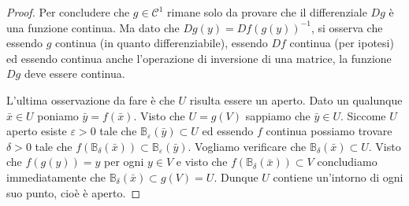 \documentclass[italian]{article}
\theoremstyle{remark}
\newcommand{\CC}{{\mathcal C}}           %
\newcommand{\B}{{\mathbb B}}  %
\renewcommand{\epsilon}{{\varepsilon}}  %
\begin{document}
\begin{proof}
Per concludere che $g\in \CC^1$ rimane solo da provare che il 
differenziale $Dg$ \`e una funzione continua. Ma dato che
$Dg(y)=Df(g(y))^{-1}$, si osserva che essendo $g$ continua (in quanto
differenziabile), essendo $Df$ continua (per ipotesi) ed essendo
continua anche l'operazione di inversione di una matrice, la funzione
$Dg$ deve essere continua.

L'ultima osservazione da fare \`e che $U$ risulta essere un aperto.
Dato un qualunque $\bar x \in U$ poniamo $\bar y= f(\bar x)$. Visto
che $U=g(V)$ sappiamo che $\bar y \in U$. Siccome $U$ aperto esiste
$\epsilon>0$ tale che $\B_\epsilon(\bar y)\subset U$ ed essendo $f$
continua possiamo trovare $\delta>0$ tale che $f(\B_\delta(\bar x))
\subset \B_\epsilon(\bar y)$. Vogliamo verificare che $\B_\delta(\bar
x) \subset U$. Visto che $f(g(y))=y$ per ogni $y\in V$ e visto che 
$f(\B_\delta(\bar x))\subset V$ concludiamo immediatamente che
$\B_\delta(\bar x) \subset g(V) = U$. Dunque $U$ contiene un'intorno
di ogni suo punto, cio\`e \`e aperto.
\end{proof}
\end{document}
